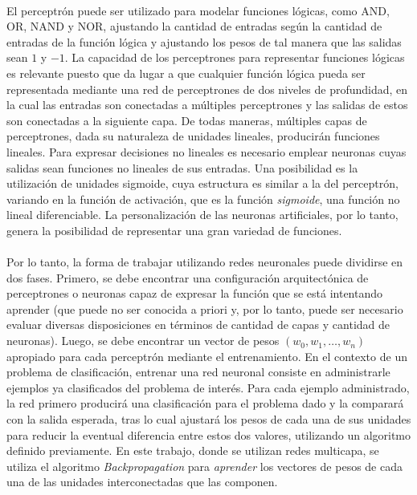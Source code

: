 \paragraph{}El perceptrón puede ser utilizado para modelar funciones lógicas, como AND, OR, NAND y NOR, ajustando la cantidad de entradas según la cantidad de entradas de la función lógica y ajustando los pesos de tal manera que las salidas sean $1$ y $-1$.
La capacidad de los perceptrones para representar funciones lógicas es relevante puesto que da lugar a que cualquier función lógica pueda ser representada mediante una red de perceptrones de dos niveles de profundidad, en la cual las entradas son conectadas a múltiples perceptrones y las salidas de estos son conectadas a la siguiente capa.
De todas maneras, múltiples capas de perceptrones, dada su naturaleza de unidades lineales, producirán funciones lineales.
Para expresar decisiones no lineales es necesario emplear neuronas cuyas salidas sean funciones no lineales de sus entradas.
Una posibilidad es la utilización de unidades sigmoide, cuya estructura es similar a la del perceptrón, variando en la función de activación, que es la función \textit{sigmoide}, una función no lineal diferenciable.
La personalización de las neuronas artificiales, por lo tanto, genera la posibilidad de representar una gran variedad de funciones.

\paragraph{}Por lo tanto, la forma de trabajar utilizando redes neuronales puede dividirse en dos fases.
Primero, se debe encontrar una configuración arquitectónica de perceptrones o neuronas capaz de expresar la función que se está intentando aprender (que puede no ser conocida a priori y, por lo tanto, puede ser necesario evaluar diversas disposiciones en términos de cantidad de capas y cantidad de neuronas).
Luego, se debe encontrar un vector de pesos $(w_0,w_1,\dots,w_n)$ apropiado para cada perceptrón mediante el entrenamiento. 
En el contexto de un problema de clasificación, entrenar una red neuronal consiste en administrarle ejemplos ya clasificados del problema de interés.
Para cada ejemplo administrado, la red primero producirá una clasificación para el problema dado y la comparará con la salida esperada, tras lo cual ajustará los pesos de cada una de sus unidades para reducir la eventual diferencia entre estos dos valores, utilizando un algoritmo definido previamente.
En este trabajo, donde se utilizan redes multicapa, se utiliza el algoritmo \textit{Backpropagation} para \textit{aprender} los vectores de pesos de cada una de las unidades interconectadas que las componen. 

